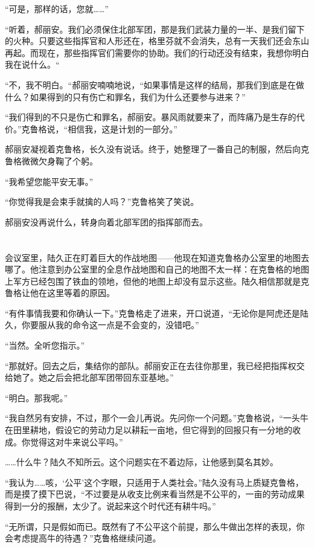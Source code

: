 “可是，那样的话，您就……”

“听着，郝丽安。我们必须保住北部军团，那是我们武装力量的一半、是我们留下的火种。只要这些指挥官和人形还在，格里芬就不会消失，总有一天我们还会东山再起。而现在，那些指挥官们需要你的协助。我们的行动还没有结束，我想你明白我在说什么。“

“不，我不明白。“郝丽安喃喃地说，“如果事情是这样的结局，那我们到底是在做什么？如果得到的只有伤亡和罪名，我们为什么还要参与进来？”

“我们得到的不只是伤亡和罪名，郝丽安。暴风雨就要来了，而阵痛乃是生存的代价。”克鲁格说，“相信我，这是计划的一部分。”

郝丽安凝视着克鲁格，长久没有说话。终于，她整理了一番自己的制服，然后向克鲁格微微欠身鞠了个躬。

“我希望您能平安无事。”

“你觉得我是会束手就擒的人吗？”克鲁格笑了笑说。

郝丽安没再说什么，转身向着北部军团的指挥部而去。

\section*{}

会议室里，陆久正在盯着巨大的作战地图——他现在知道克鲁格办公室里的地图去哪了。他注意到办公室里的全息作战地图和自己的地图不太一样：在克鲁格的地图上军方已经包围了铁血的领地，但他的地图上却没有显示这些。陆久相信那就是克鲁格让他在这里等着的原因。

“有件事情我要和你确认一下。”克鲁格走了进来，开口说道，“无论你是阿虎还是陆久，你要服从我的命令这一点是不会变的，没错吧。”

“当然。全听您指示。”

“那就好。回去之后，集结你的部队。郝丽安正在去往你那里，我已经把指挥权交给她了。她之后会把北部军团带回东亚基地。”

“明白。那我呢。”

“我自然另有安排，不过，那个一会儿再说。先问你一个问题。”克鲁格说，“一头牛在田里耕地，假设它的劳动力足以耕耘一亩地，但它得到的回报只有一分地的收成。你觉得这对牛来说公平吗。”

……什么牛？陆久不知所云。这个问题实在不着边际，让他感到莫名其妙。

“我认为……咳，‘公平’这个字眼，只适用于人类社会。”陆久没有马上质疑克鲁格，而是摸了摸下巴说，“不过要是从收支比例来看当然是不公平的，一亩的劳动成果得到一分的报酬，太少了。说起来这个时代还有耕牛吗。”

“无所谓，只是假如而已。既然有了不公平这个前提，那么牛做出怎样的表现，你会考虑提高牛的待遇？”克鲁格继续问道。

